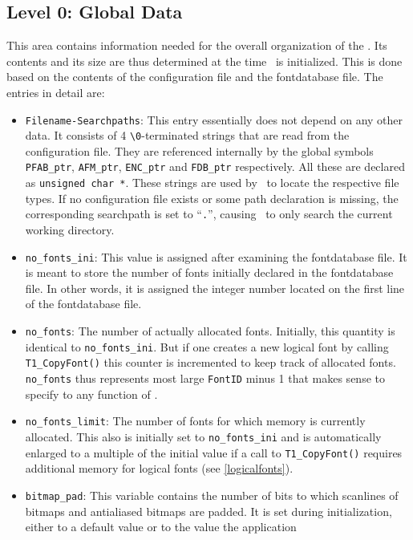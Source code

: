 \subsection{Level 0: Global Data}
\label{globaldata}%
This area contains information needed for the overall organization of the
\tonelib. Its contents and its size are thus determined at the time
\tonelib\ is initialized. This is done based on the contents of the
configuration file and the fontdatabase file. The entries in detail are:
\begin{itemize}
\item {\tt Filename-Searchpaths}: This entry essentially does not depend on
  any other data. It consists of 4 \verb+\0+-terminated strings that are read
  from the configuration file. They are referenced internally by the global
  symbols
  \verb+PFAB_ptr+, \verb+AFM_ptr+, \verb+ENC_ptr+ and \verb+FDB_ptr+
  respectively. All these are declared as \verb+unsigned char *+. These
  strings are used by \tonelib\ to locate the respective file types. If no
  configuration file exists or some path declaration is missing, the
  corresponding searchpath is set to ``\verb+.+'', causing \tonelib\ to only
  search the current working directory. 
\item \verb+no_fonts_ini+: This value is assigned after examining the
  fontdatabase file. It is meant to store the number of fonts initially
  declared in the fontdatabase file. In other words, it is assigned the
  integer number located on the first line of the fontdatabase file.
\item \verb+no_fonts+: The number of actually allocated fonts. Initially, this
  quantity is identical to \verb+no_fonts_ini+. But if one creates a new
  logical font by calling \verb+T1_CopyFont()+ this counter is incremented to
  keep track of allocated fonts. \verb+no_fonts+ thus represents most large
  \verb+FontID+ minus 1 that makes sense to specify to any function of
  \tonelib. 
\item \verb+no_fonts_limit+: The number of fonts for which memory is currently
  allocated. This also is initially set to \verb+no_fonts_ini+ and is
  automatically enlarged to a multiple of the initial value if a call to
  \verb+T1_CopyFont()+ requires additional memory for logical fonts (see
  \ref{logicalfonts}). 
\item \verb+bitmap_pad+: This variable contains the number of bits to which
  scanlines of bitmaps and antialiased bitmaps are padded. It is set during
  initialization, either to a default value or to the value the application

\end{itemize}
